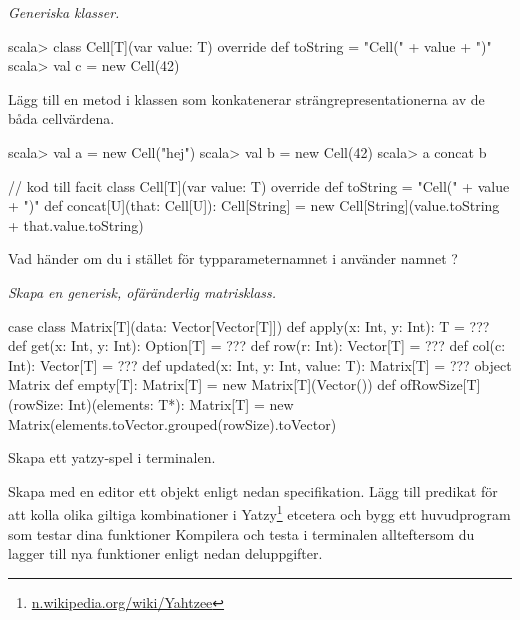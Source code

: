 \Task \emph{Generiska klasser.} 

\begin{REPL}
scala> class Cell[T](var value: T){
         override def toString = "Cell(" + value + ")"
       }
scala> val c = new Cell(42)
\end{REPL}

\Subtask Lägg till en metod  i klassen  som konkatenerar strängrepresentationerna av de båda cellvärdena.

\begin{REPL}
scala> val a = new Cell("hej")
scala> val b = new Cell(42)
scala> a concat b
\end{REPL}

\begin{Code}
// kod till facit
class Cell[T](var value: T){
  override def toString = "Cell(" + value + ")"
  def concat[U](that: Cell[U]): Cell[String] = 
    new Cell[String](value.toString + that.value.toString)
}
\end{Code}

\Subtask\Pen Vad händer om du i stället för typparameternamnet  i  använder namnet ?

\Task \emph{Skapa en generisk, ofäränderlig matrisklass.}

\begin{Code}
case class Matrix[T](data: Vector[Vector[T]]) {
  def apply(x: Int, y: Int): T = ???
  def get(x: Int, y: Int): Option[T] = ???
  def row(r: Int): Vector[T] = ???
  def col(c: Int): Vector[T] = ???
  def updated(x: Int, y: Int, value: T): Matrix[T] = ???
}
object Matrix {
  def empty[T]: Matrix[T] = new Matrix[T](Vector())
  def ofRowSize[T](rowSize: Int)(elements: T*): Matrix[T] =
    new Matrix(elements.toVector.grouped(rowSize).toVector)
}
\end{Code}

\Subtask 

\ExtraTasks %

\Task Skapa ett yatzy-spel i terminalen.

\Subtask Skapa med en editor ett objekt enligt nedan specifikation. Lägg till predikat för att kolla olika giltiga kombinationer i Yatzy\footnote{\href{https://en.wikipedia.org/wiki/Yahtzee}{n.wikipedia.org/wiki/Yahtzee}} etcetera och bygg ett huvudprogram som testar dina funktioner Kompilera och testa i terminalen allteftersom du lagger till nya funktioner enligt nedan deluppgifter.

